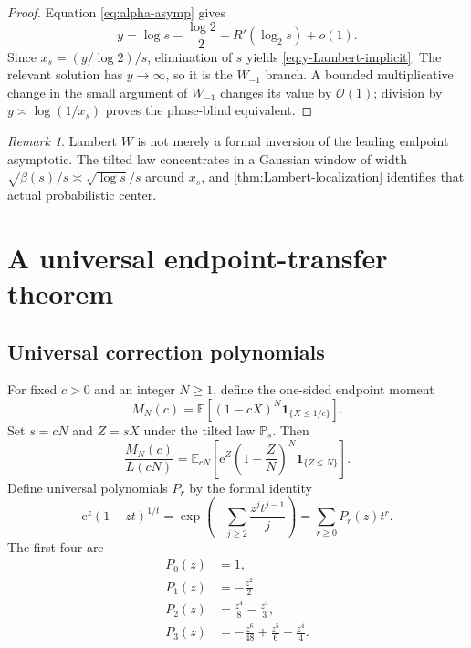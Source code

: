 \documentclass[11pt,oneside]{article}
\theoremstyle{definition}
\theoremstyle{remark}
\newtheorem{remark}[theorem]{Remark}
\newcommand{\e}{\mathrm e}
\newcommand{\E}{\mathbb E}
\newcommand{\Prob}{\mathbb P}
\newcommand{\bigO}{\mathcal O}
\newcommand{\smallo}{o}
\begin{document}
\begin{proof}
Equation \cref{eq:alpha-asymp} gives
\[
 y=\log s-\frac{\log2}{2}-R'(\log_2s)+\smallo(1).
\]
Since $x_s=(y/\log2)/s$, elimination of $s$ yields
\cref{eq:y-Lambert-implicit}.  The relevant solution has $y\to\infty$, so it
is the $W_{-1}$ branch.  A bounded multiplicative change in the small argument
of $W_{-1}$ changes its value by $\bigO(1)$; division by
$y\asymp\log(1/x_s)$ proves the phase-blind equivalent.
\end{proof}

\begin{remark}
Lambert $W$ is not merely a formal inversion of the leading endpoint
asymptotic.  The tilted law concentrates in a Gaussian window of width
$\sqrt{\beta(s)}/s\asymp\sqrt{\log s}/s$ around $x_s$, and
\cref{thm:Lambert-localization} identifies that actual probabilistic center.
\end{remark}

\section{A universal endpoint-transfer theorem}

\subsection{Universal correction polynomials}

For fixed $c>0$ and an integer $N\ge1$, define the one-sided endpoint moment
\begin{equation}\label{eq:MNc}
 M_N(c)=\E\left[(1-cX)^N\bm1_{\{X\le1/c\}}\right].
\end{equation}
Set $s=cN$ and $Z=sX$ under the tilted law $\Prob_s$.  Then
\begin{equation}\label{eq:MN-tilt-exact}
 \frac{M_N(c)}{L(cN)}
 =\E_{cN}\left[\e^Z\left(1-\frac ZN\right)^N
 \bm1_{\{Z\le N\}}\right].
\end{equation}
Define universal polynomials $P_r$ by the formal identity
\begin{equation}\label{eq:P-polynomials-def}
 \e^z(1-zt)^{1/t}
 =\exp\!\left(-\sum_{j\ge2}\frac{z^jt^{j-1}}j\right)
 =\sum_{r\ge0}P_r(z)t^r.
\end{equation}
The first four are
\begin{align}
 P_0(z)&=1,\nonumber\\
 P_1(z)&=-\frac{z^2}{2},\nonumber\\
 P_2(z)&=\frac{z^4}{8}-\frac{z^3}{3},\label{eq:P-first}\\
 P_3(z)&=-\frac{z^6}{48}+\frac{z^5}{6}-\frac{z^4}{4}.\nonumber
\end{align}
\end{document}
